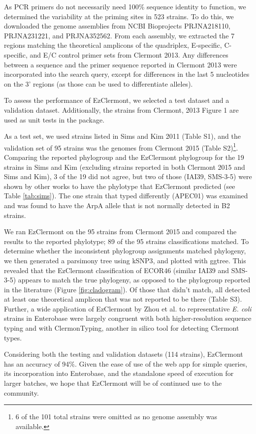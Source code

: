 As PCR primers do not necessarily need 100\% sequence identity to function, we determined the variability at the priming sites in 523 strains. To do this, we downloaded the genome assemblies from NCBI Bioprojects PRJNA218110, PRJNA231221, and PRJNA352562.  From each assembly, we extracted the 7 regions matching the theoretical amplicons of the quadriplex, E-specific, C-specific, and E/C control primer sets from Clermont 2013.  Any differences between a sequence and the primer sequence reported in Clermont 2013 were incorporated into the search query, except for differences in the last 5 nucleotides on the 3’ regions (as those can be used to differentiate alleles)\cite{Stadhouders2010}.

To assess the performance of EzClermont, we selected a test dataset and a validation dataset.  Additionally, the strains from Clermont, 2013 Figure 1 are used as unit tests in the package.

As a test set, we used strains listed in Sims and Kim 2011\cite{Sims2011} (Table S1), and the validation set of 95 strains was the genomes from Clermont 2015\cite{Denamur2015} (Table S2)\footnote{6 of the 101 total strains were omitted as no genome assembly was available.}.  Comparing the reported phylogroup and the EzClermont phylogroup for the 19 strains in Sims and Kim (excluding strains reported in both Clermont 2015 and Sims and Kim),  3 of the 19 did not agree, but two of those (IAI39, SMS-3-5) were shown by other works to have the phylotype that EzClermont predicted (see Table \ref{tab:sims}).  The one strain that typed differently (APEC01) was examined and was found to have the ArpA allele that is not normally detected in B2 strains.





We ran EzClermont on the 95 strains from Clermont 2015 and compared the results to the reported phylotype; 89 of the 95 strains classifications matched.  To determine whether the inconsistent phylogroup assignments matched phylogeny, we then generated a parsimony tree using kSNP3\cite{Gardner2015a}, and plotted with ggtree\cite{Yu2017a}. This revealed that the EzClermont classification of ECOR46 (similar IAI39 and SMS-3-5) appears to match the true phylogeny, as opposed to the phylogroup reported in the literature (Figure \ref{fig:cladogram}).  Of those that didn’t match, all detected at least one theoretical amplicon that was not reported to be there (Table S3). Further, a wide application of EzClermont by Zhou et al.\cite{zhou_users_2019} to representative \textit{E. coli}  strains in Enterobase were largely congruent with both higher-resolution sequence typing and with ClermonTyping\cite{beghain_clermontyping:_2018}, another in silico tool for detecting Clermont types.





Considering both the testing and validation datasets (114 strains), EzClermont has an accuracy of 94\%. Given the ease of use of the web app for simple queries, its incorporation into Enterobase, and the standalone speed of execution for larger batches, we hope that EzClermont will be of continued use to the community.
